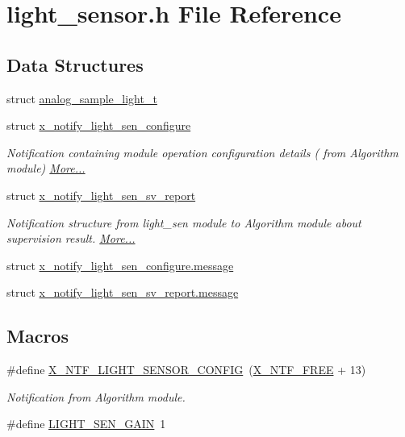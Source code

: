 \hypertarget{a00018}{\section{light\+\_\+sensor.\+h File Reference}
\label{a00018}
}
\subsection*{Data Structures}
\begin{DoxyCompactItemize}
\item 
struct \hyperlink{a00018_dd/d42/a00109}{analog\+\_\+sample\+\_\+light\+\_\+t}
\item 
struct \hyperlink{a00018_da/de3/a00856}{x\+\_\+notify\+\_\+light\+\_\+sen\+\_\+configure}
\begin{DoxyCompactList}\small\item\em Notification containing module operation configuration details ( from Algorithm module)  \hyperlink{a00018_da/de3/a00856}{More...}\end{DoxyCompactList}\item 
struct \hyperlink{a00018_d0/d66/a00858}{x\+\_\+notify\+\_\+light\+\_\+sen\+\_\+sv\+\_\+report}
\begin{DoxyCompactList}\small\item\em Notification structure from light\+\_\+sen module to Algorithm module about supervision result.  \hyperlink{a00018_d0/d66/a00858}{More...}\end{DoxyCompactList}\item 
struct \hyperlink{a00018_d0/d82/a00857}{x\+\_\+notify\+\_\+light\+\_\+sen\+\_\+configure.\+message}
\item 
struct \hyperlink{a00018_dc/d8c/a00859}{x\+\_\+notify\+\_\+light\+\_\+sen\+\_\+sv\+\_\+report.\+message}
\end{DoxyCompactItemize}
\subsection*{Macros}
\begin{DoxyCompactItemize}
\item 
\#define \hyperlink{a00018_ac8c3accc8173c965137b300542e451e6}{X\+\_\+\+N\+T\+F\+\_\+\+L\+I\+G\+H\+T\+\_\+\+S\+E\+N\+S\+O\+R\+\_\+\+C\+O\+N\+F\+I\+G}~(\hyperlink{a00036_ab2eeea4643823a0c7c7731ddb83e3edc}{X\+\_\+\+N\+T\+F\+\_\+\+F\+R\+E\+E} + 13)
\begin{DoxyCompactList}\small\item\em Notification from Algorithm module. \end{DoxyCompactList}\item 
\#define \hyperlink{a00018_a67d542941eaade236c5f5a224efc7653}{L\+I\+G\+H\+T\+\_\+\+S\+E\+N\+\_\+\+G\+A\+I\+N}~1
\end{DoxyCompactItemize}

